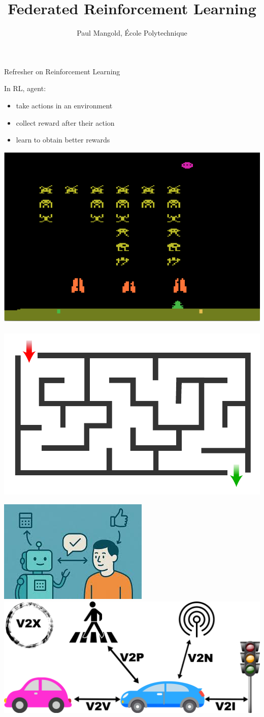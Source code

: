 \documentclass[12pt,aspectratio=169]{beamer}
\title{Federated Reinforcement Learning}
\author{Paul Mangold, École Polytechnique}
\begin{document}
\begin{frame}
  \titlepage
\end{frame}

\begin{frame}{Refresher on Reinforcement Learning}


  \begin{minipage}[t]{0.45\linewidth}
    \vspace{-2em}
    In RL, agent:
    \begin{itemize}
    \item take actions in an environment
    \item collect reward after their action
    \item learn to obtain better rewards
    \end{itemize}
  \end{minipage}\hspace{2em}
  \begin{minipage}[t]{0.45\linewidth}
    
    \includegraphics[width=0.5\linewidth]{images/ataribench.png}~~~~~%
    \includegraphics[width=0.45\linewidth]{images/maze_simple.pdf}

    \vspace{1em}
    
    \includegraphics[width=0.5\linewidth]{images/rlhf.jpeg}~~~~~~
    \includegraphics[width=0.45\linewidth]{images/Types_V2X.png}
  \end{minipage}
  
\end{frame}
\end{document}

